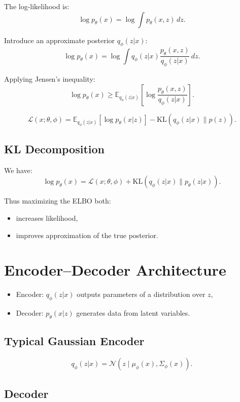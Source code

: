The log-likelihood is:
\[
\log p_\theta(x) = \log \int p_\theta(x,z)\,dz.
\]

Introduce an approximate posterior $q_\phi(z|x)$:
\[
\log p_\theta(x)
=
\log \int q_\phi(z|x)\frac{p_\theta(x,z)}{q_\phi(z|x)}\,dz.
\]

Applying Jensen's inequality:
\[
\log p_\theta(x)
\ge
\mathbb{E}_{q_\phi(z|x)}\left[\log \frac{p_\theta(x,z)}{q_\phi(z|x)}\right].
\]

\begin{definition}[ELBO]
\[
\mathcal{L}(x;\theta,\phi)
=
\mathbb{E}_{q_\phi(z|x)}[\log p_\theta(x|z)]
-
\mathrm{KL}(q_\phi(z|x)\|p(z)).
\]
\end{definition}

\subsection{KL Decomposition}

We have:
\[
\log p_\theta(x)
=
\mathcal{L}(x;\theta,\phi)
+
\mathrm{KL}(q_\phi(z|x)\|p_\theta(z|x)).
\]

Thus maximizing the ELBO both:
\begin{itemize}
    \item increases likelihood,
    \item improves approximation of the true posterior.
\end{itemize}

\section{Encoder--Decoder Architecture}

\begin{itemize}
    \item Encoder: $q_\phi(z|x)$ outputs parameters of a distribution over $z$,
    \item Decoder: $p_\theta(x|z)$ generates data from latent variables.
\end{itemize}

\subsection{Typical Gaussian Encoder}

\[
q_\phi(z|x) = \mathcal{N}(z \mid \mu_\phi(x), \Sigma_\phi(x)).
\]

\subsection{Decoder}


